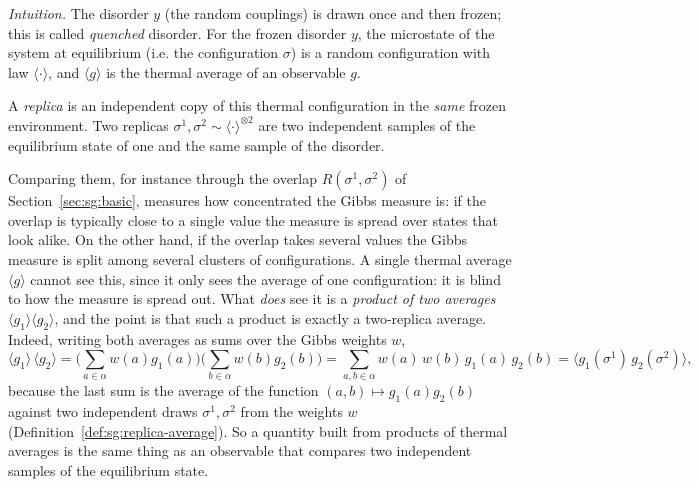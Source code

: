 \begin{remark}\label{rem:sg:replicas}
\emph{Intuition.} The disorder $y$ (the random couplings) is drawn once and then frozen; this is called \emph{quenched}
disorder. For the frozen disorder $y$, the microstate of the system at equilibrium (i.e. the configuration $\sigma$) is a random configuration with law $\langle\cdot\rangle$, and
$\langle g\rangle$ is the thermal average of an observable $g$. 

A \emph{replica} is an independent copy of this thermal
configuration in the \emph{same} frozen environment. Two replicas $\sigma^1,\sigma^2\sim\langle\cdot\rangle^{\otimes2}$ are
two independent samples of the equilibrium state of one and the same sample of the disorder. 

Comparing them, for instance through
the overlap $R(\sigma^1,\sigma^2)$ of Section~\ref{sec:sg:basic}, measures how concentrated the Gibbs measure is: if the
overlap is typically close to a single value the measure is spread over states that look alike. On the other hand, if the overlap takes
several values the Gibbs measure is split among several clusters of configurations. A single thermal average $\langle g\rangle$
cannot see this, since it only sees the average of one configuration: it is blind to how the measure is spread out. What \emph{does} see it is a \emph{product of two averages}
$\langle g_1\rangle\langle g_2\rangle$, and the point is that such a product is exactly a two-replica average. Indeed, writing both averages as sums over the Gibbs weights $w$,
\[\langle g_1\rangle\,\langle g_2\rangle=\Big(\sum_{a\in\alpha}w(a)g_1(a)\Big)\Big(\sum_{b\in\alpha}w(b)g_2(b)\Big)=\sum_{a,b\in\alpha}w(a)\,w(b)\,g_1(a)\,g_2(b)=\big\langle g_1(\sigma^1)\,g_2(\sigma^2)\big\rangle,\]
because the last sum is the average of the function $(a,b)\mapsto g_1(a)g_2(b)$ against two independent draws $\sigma^1,\sigma^2$ from the weights $w$ (Definition~\ref{def:sg:replica-average}). So a quantity built from products of thermal
averages is the same thing as an observable that compares two independent samples of the equilibrium state.


\end{remark}
